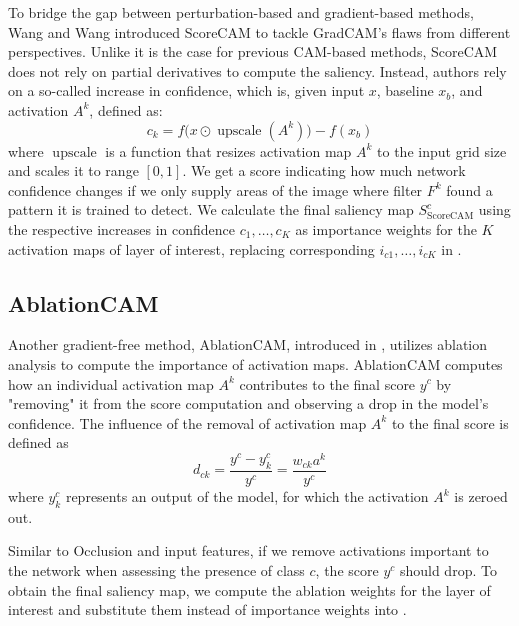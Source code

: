 To bridge the gap between perturbation-based and gradient-based methods, Wang and Wang \cite{score-cam} introduced ScoreCAM to tackle GradCAM's flaws from different perspectives.
Unlike it is the case for previous CAM-based methods, ScoreCAM does not rely on partial derivatives to compute the saliency.
Instead, authors rely on a so-called increase in confidence, which is, given input $x$, baseline $x_b$, and activation $A^k$, defined as:
\begin{equation}
    c_k = f\bigl(x \odot \operatorname{upscale}(A^k)\bigr) - f(x_b)
\end{equation}
where $\operatorname{upscale}$ is a function that resizes activation map $A^k$ to the input grid size and scales it to range $[0, 1]$.
We get a score indicating how much network confidence changes if we only supply areas of the image where filter $F^k$ found a pattern it is trained to detect.
We calculate the final saliency map $S^c_{\text{ScoreCAM}}$ using the respective increases in confidence $c_1, \ldots, c_K$ as importance weights for the $K$ activation maps of layer of interest, replacing corresponding $i_{c1}, \ldots, i_{cK}$ in .

\subsection{AblationCAM}

Another gradient-free method, AblationCAM, introduced in \cite{ablation-cam}, utilizes ablation analysis to compute the importance of activation maps.
AblationCAM computes how an individual activation map $A^k$ contributes to the final score $y^c$ by "removing" it from the score computation and observing a drop in the model's confidence.
The influence of the removal of activation map $A^k$ to the final score is defined as
\begin{equation}\label{eq:ablation-cam-importance-weight}
    d_{ck} = \frac{y^c - y^c_k}{y^c} = \frac{w_{ck}a^k}{y^c}
\end{equation}
where $y^c_k$ represents an output of the model, for which the activation $A^k$ is zeroed out.

Similar to Occlusion and input features, if we remove activations important to the network when assessing the presence of class $c$, the score $y^c$ should drop. To obtain the final saliency map, we compute the ablation weights for the layer of interest and substitute them instead of importance weights into .

